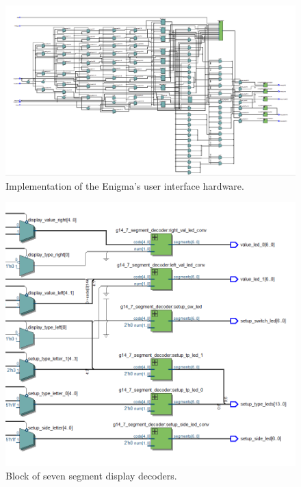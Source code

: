 \documentclass{article}
\begin{document}
\begin{figure}[ht!]
    \centering
    \includegraphics[scale=0.3]{interface_block_diag.PNG}
    \caption{Implementation of the Enigma's user interface hardware.}
    \label{fig:ui_block_diagram}
\end{figure}

\begin{figure}[ht!]
    \centering
    \includegraphics[scale=0.4]{seven_seg_decoders_block.PNG}
    \caption{Block of seven segment display decoders.}
    \label{fig:seven_segment_decoders}
\end{figure}
\end{document}
